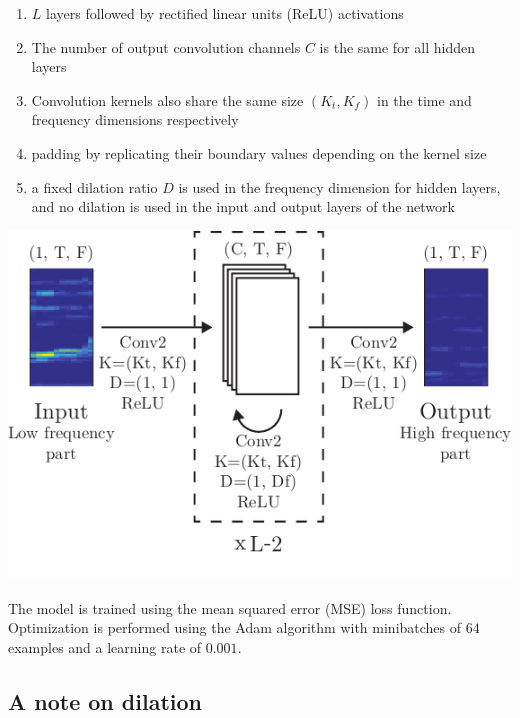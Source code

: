 \documentclass[a0,portrait,20pt]{a0poster}
\begin{document}
\begin{multicols}{2}
\begin{minipage}[c]{.5\linewidth}
\begin{enumerate}
  \item $L$ layers followed by rectified linear units (ReLU) activations
  \item The number of output convolution channels $C$ is the same for all hidden layers
   \item Convolution kernels also share the same size $(K_t, K_f)$ in the time and frequency dimensions respectively
   \item padding by replicating their boundary values depending on the kernel size
   \item a fixed dilation ratio $D$ is used in the frequency dimension for hidden layers, and no dilation is used in the input and output layers of the network
\end{enumerate}
\end{minipage}
\begin{minipage}[c]{.5\linewidth}
  \hspace{2cm}\begin{center}\vspace{1cm}
  \includegraphics[width=.9\linewidth]{mdl}
  \end{center}\vspace{1cm}
\end{minipage}

The model is trained using the mean squared error (MSE) loss function. Optimization is performed using the Adam algorithm with minibatches of $64$ examples and a learning rate of $0.001$.

\subsection*{A note on dilation}


\end{multicols}
\end{document}
